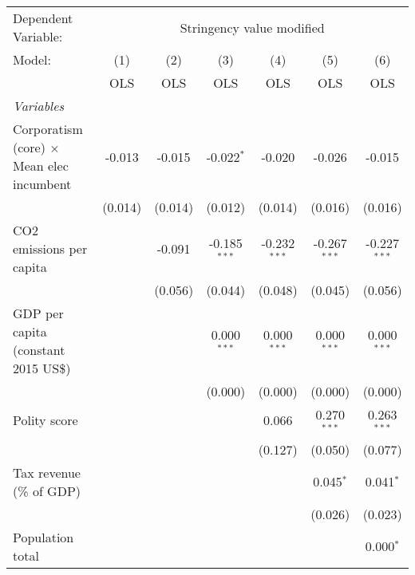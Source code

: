 
\begingroup
\centering
\begin{tabular}{lcccccc}
   \toprule
   Dependent Variable: & \multicolumn{6}{c}{Stringency value modified}\\
   Model:                                           & (1)     & (2)     & (3)            & (4)            & (5)            & (6)\\  
                                                    &  OLS    & OLS     & OLS            & OLS            & OLS            & OLS\\  
   \midrule
   \emph{Variables}\\
   Corporatism (core) $\times$ Mean elec incumbent  & -0.013  & -0.015  & -0.022$^{*}$   & -0.020         & -0.026         & -0.015\\   
                                                    & (0.014) & (0.014) & (0.012)        & (0.014)        & (0.016)        & (0.016)\\   
   CO2 emissions per capita                         &         & -0.091  & -0.185$^{***}$ & -0.232$^{***}$ & -0.267$^{***}$ & -0.227$^{***}$\\   
                                                    &         & (0.056) & (0.044)        & (0.048)        & (0.045)        & (0.056)\\   
   GDP per capita (constant 2015 US\$)              &         &         & 0.000$^{***}$  & 0.000$^{***}$  & 0.000$^{***}$  & 0.000$^{***}$\\   
                                                    &         &         & (0.000)        & (0.000)        & (0.000)        & (0.000)\\   
   Polity score                                     &         &         &                & 0.066          & 0.270$^{***}$  & 0.263$^{***}$\\   
                                                    &         &         &                & (0.127)        & (0.050)        & (0.077)\\   
   Tax revenue (\% of GDP)                          &         &         &                &                & 0.045$^{*}$    & 0.041$^{*}$\\   
                                                    &         &         &                &                & (0.026)        & (0.023)\\   
   Population total                                 &         &         &                &                &                & 0.000$^{*}$\\   

\end{tabular}
